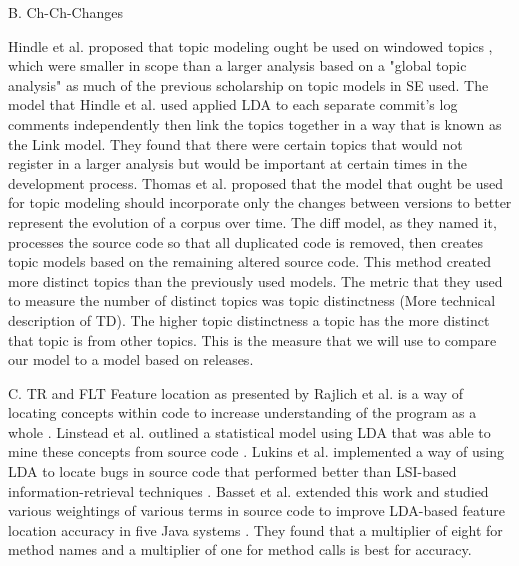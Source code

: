 B. Ch-Ch-Changes

Hindle et al. proposed that topic modeling ought be used on windowed topics \cite{Hindle2009}, which were smaller in scope than a larger analysis based on a "global topic analysis" as much of the previous scholarship on topic models in SE used. The model that Hindle et al. used applied LDA to each separate commit's log comments independently then link the topics together in a way that is known as the Link model. They found that there were certain topics that would not register in a larger analysis but would be important at certain times in the development process. 
Thomas et al. proposed that the model that ought be used for topic modeling should incorporate only the changes between versions \cite{Thomas2011} to better represent the evolution of a corpus over time. The diff model, as they named it, processes the source code so that all duplicated code is removed, then creates topic models based on the remaining altered source code. This method created more distinct topics than the previously used models. The metric that they used to measure the number of distinct topics was topic distinctness (More technical description of TD). The higher topic distinctness a topic has the more distinct that topic is from other topics. This is the measure that we will use to compare our model to a model based on releases.

C. TR and FLT
Feature location as presented by Rajlich et al. is a way of locating concepts within code to increase understanding of the program as a whole \cite{Rajlich2002}. Linstead et al. outlined a statistical model using LDA that was able to mine these concepts from source code \cite{Linstead2007_2}. Lukins et al. implemented a way of using LDA to locate bugs in source code that performed better than LSI-based information-retrieval techniques \cite{Lukins2008}. Basset et al. extended this work and studied various weightings of various terms in source code to improve LDA-based feature location accuracy in five Java systems \cite{Bassett2013}. They found that a multiplier of eight for method names and a multiplier of one for method calls is best for accuracy.


